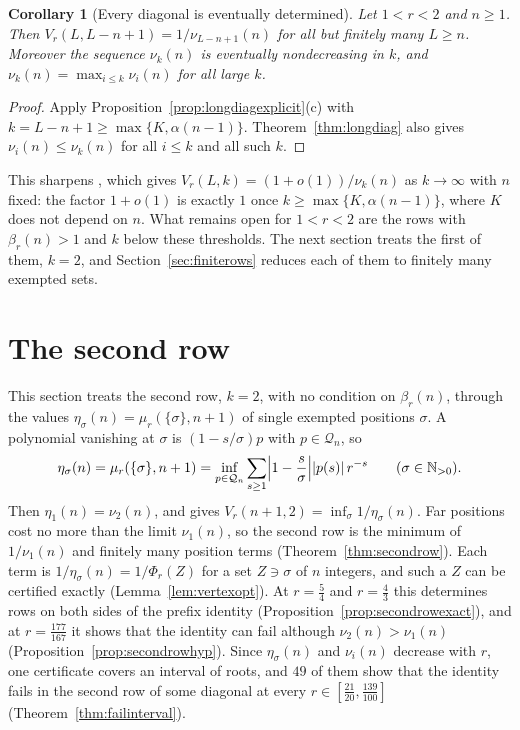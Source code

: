 \documentclass[11pt]{article}
\newtheorem{corollary}[theorem]{Corollary}
\newcommand{\N}{\mathbb N}
\begin{document}
\begin{corollary}[Every diagonal is eventually determined]\label{cor:longdiagfinite}
Let $1<r<2$ and $n\ge1$.  Then $V_r(L,L-n+1)=1/\nu_{L-n+1}(n)$ for all but
finitely many $L\ge n$.  Moreover the sequence $\nu_k(n)$ is eventually
nondecreasing in $k$, and $\nu_k(n)=\max_{i\le k}\nu_i(n)$ for all large $k$.
\end{corollary}

\begin{proof}
Apply Proposition~\ref{prop:longdiagexplicit}(c) with $k=L-n+1\ge\max\{K,\alpha(n-1)\}$.
Theorem~\ref{thm:longdiag} also gives $\nu_i(n)\le\nu_k(n)$ for all
$i\le k$ and all such $k$.
\end{proof}

This sharpens \cite[Corollary~3.5]{coefficient-mass-rows}, which gives
$V_r(L,k)=(1+o(1))/\nu_k(n)$ as $k\to\infty$ with $n$ fixed: the factor
$1+o(1)$ is exactly $1$ once $k\ge\max\{K,\alpha(n-1)\}$, where $K$ does not
depend on $n$.
What remains open for $1<r<2$ are the rows with $\beta_r(n)>1$ and $k$
below these thresholds.  The next section treats the first of them,
$k=2$, and Section~\ref{sec:finiterows} reduces each of them to finitely
many exempted sets.

\section{The second row}\label{sec:secondrow}

This section treats the second row, $k=2$, with no condition on
$\beta_r(n)$, through the values $\eta_\sigma(n)=\mu_r(\{\sigma\},n+1)$ of
single exempted positions $\sigma$.  A polynomial vanishing at $\sigma$ is
$(1-s/\sigma)p$ with $p\in\mathcal Q_n$, so
\[
  \eta_\sigma(n)=\mu_r(\{\sigma\},n+1)
  =\inf_{p\in\mathcal Q_n}\sum_{s\ge1}\Bigl|1-\frac s\sigma\Bigr||p(s)|\,r^{-s}
  \qquad(\sigma\in\N_{>0}).
\]
Then $\eta_1(n)=\nu_2(n)$, and \cite[Proposition~2.1(b)]{coefficient-mass-rows} gives
$V_r(n+1,2)=\inf_\sigma1/\eta_\sigma(n)$.  Far positions cost no more than
the limit $\nu_1(n)$, so the second row is the minimum of $1/\nu_1(n)$ and
finitely many position terms (Theorem~\ref{thm:secondrow}).  Each term is
$1/\eta_\sigma(n)=1/\Phi_r(Z)$ for a set $Z\ni\sigma$ of $n$ integers, and
such a $Z$ can be certified exactly
(Lemma~\ref{lem:vertexopt}).  At $r=\frac54$ and $r=\frac43$
this determines rows on both sides of the prefix identity
(Proposition~\ref{prop:secondrowexact}), and at $r=\frac{177}{167}$ it
shows that the identity can fail although $\nu_2(n)>\nu_1(n)$
(Proposition~\ref{prop:secondrowhyp}).  Since $\eta_\sigma(n)$ and
$\nu_i(n)$ decrease with $r$, one certificate covers an interval of roots,
and $49$ of them show that the identity fails in the second row of some
diagonal at every $r\in[\frac{21}{20},\frac{139}{100}]$
(Theorem~\ref{thm:failinterval}).
\end{document}
